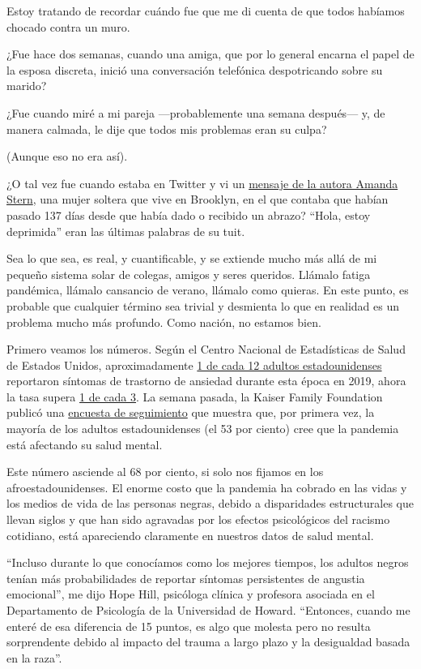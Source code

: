 Estoy tratando de recordar cuándo fue que me di cuenta de que todos
habíamos chocado contra un muro.

¿Fue hace dos semanas, cuando una amiga, que por lo general encarna el
papel de la esposa discreta, inició una conversación telefónica
despotricando sobre su marido?

¿Fue cuando miré a mi pareja ---probablemente una semana después--- y,
de manera calmada, le dije que todos mis problemas eran su culpa?

(Aunque eso no era así).

¿O tal vez fue cuando estaba en Twitter y vi un
\href{https://twitter.com/amandastern/status/1284639637252845570}{mensaje
de la autora Amanda Stern}, una mujer soltera que vive en Brooklyn, en
el que contaba que habían pasado 137 días desde que había dado o
recibido un abrazo? ``Hola, estoy deprimida'' eran las últimas palabras
de su tuit.

Sea lo que sea, es real, y cuantificable, y se extiende mucho más allá
de mi pequeño sistema solar de colegas, amigos y seres queridos. Llámalo
fatiga pandémica, llámalo cansancio de verano, llámalo como quieras. En
este punto, es probable que cualquier término sea trivial y desmienta lo
que en realidad es un problema mucho más profundo. Como nación, no
estamos bien.

Primero veamos los números. Según el Centro Nacional de Estadísticas de
Salud de Estados Unidos, aproximadamente
\href{https://www.cdc.gov/nchs/data/nhis/earlyrelease/ERmentalhealth-508.pdf}{1
de cada 12 adultos estadounidenses} reportaron síntomas de trastorno de
ansiedad durante esta época en 2019, ahora la tasa supera
\href{https://www.cdc.gov/nchs/covid19/pulse/mental-health.htm}{1 de
cada 3}. La semana pasada, la Kaiser Family Foundation publicó una
\href{https://www.kff.org/coronavirus-covid-19/report/kff-health-tracking-poll-july-2020/}{encuesta
de seguimiento} que muestra que, por primera vez, la mayoría de los
adultos estadounidenses (el 53 por ciento) cree que la pandemia está
afectando su salud mental.

Este número asciende al 68 por ciento, si solo nos fijamos en los
afroestadounidenses. El enorme costo que la pandemia ha cobrado en las
vidas y los medios de vida de las personas negras, debido a disparidades
estructurales que llevan siglos y que han sido agravadas por los efectos
psicológicos del racismo cotidiano, está apareciendo claramente en
nuestros datos de salud mental.

``Incluso durante lo que conocíamos como los mejores tiempos, los
adultos negros tenían más probabilidades de reportar síntomas
persistentes de angustia emocional'', me dijo Hope Hill, psicóloga
clínica y profesora asociada en el Departamento de Psicología de la
Universidad de Howard. ``Entonces, cuando me enteré de esa diferencia de
15 puntos, es algo que molesta pero no resulta sorprendente debido al
impacto del trauma a largo plazo y la desigualdad basada en la raza''.

